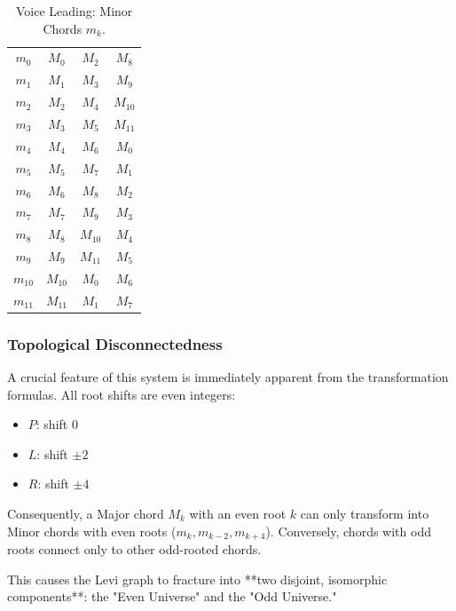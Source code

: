 \documentclass[12pt,letterpaper]{amsart}
\begin{document}
\begin{table}[H]
\begin{minipage}{0.48\textwidth}
\begin{tabular}{|c||c|c|c|}
\hline
$m_0$ & $M_0$ & $M_2$ & $M_8$ \\
$m_1$ & $M_1$ & $M_3$ & $M_9$ \\
$m_2$ & $M_2$ & $M_4$ & $M_{10}$ \\
$m_3$ & $M_3$ & $M_5$ & $M_{11}$ \\
$m_4$ & $M_4$ & $M_6$ & $M_{0}$ \\
$m_5$ & $M_5$ & $M_7$ & $M_{1}$ \\
$m_6$ & $M_6$ & $M_8$ & $M_{2}$ \\
$m_7$ & $M_7$ & $M_9$ & $M_{3}$ \\
$m_8$ & $M_8$ & $M_{10}$ & $M_{4}$ \\
$m_9$ & $M_9$ & $M_{11}$ & $M_{5}$ \\
$m_{10}$ & $M_{10}$ & $M_{0}$ & $M_{6}$ \\
$m_{11}$ & $M_{11}$ & $M_{1}$ & $M_{7}$ \\
\hline
\end{tabular}
\caption{Voice Leading: Minor Chords $m_k$.}
\label{tab:tritone_minor_vl}
\end{minipage}
\end{table}

\subsubsection{Topological Disconnectedness}
A crucial feature of this system is immediately apparent from the transformation formulas. All root shifts are even integers:
\begin{itemize}
    \item $P$: shift 0
    \item $L$: shift $\pm 2$
    \item $R$: shift $\pm 4$
\end{itemize}
Consequently, a Major chord $M_k$ with an even root $k$ can only transform into Minor chords with even roots ($m_k, m_{k-2}, m_{k+4}$). Conversely, chords with odd roots connect only to other odd-rooted chords.

This causes the Levi graph to fracture into **two disjoint, isomorphic components**: the "Even Universe" and the "Odd Universe."
\end{document}
